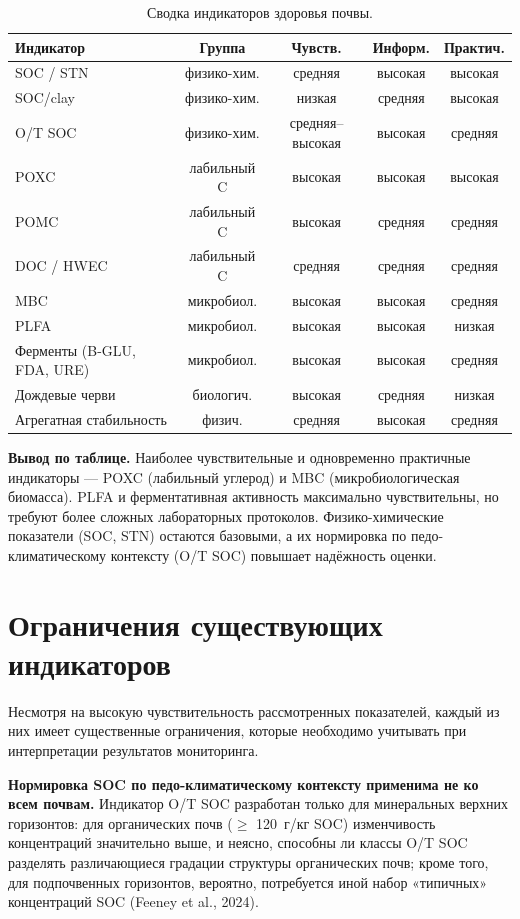 \documentclass[11pt,a4paper]{article}
\begin{document}
\begin{table}[h]
  \centering
  \caption{Сводка индикаторов здоровья почвы.}
  \label{tab:indicators}
  \small
  \begin{tabular}{lcccc}
    \toprule
    Индикатор & Группа & Чувств. & Информ. & Практич. \\
    \midrule
    SOC / STN & физико-хим. & средняя & высокая & высокая \\
    SOC/clay & физико-хим. & низкая & средняя & высокая \\
    O/T SOC & физико-хим. & средняя--высокая & высокая & средняя \\
    POXC & лабильный C & высокая & высокая & высокая \\
    POMC & лабильный C & высокая & средняя & средняя \\
    DOC / HWEC & лабильный C & средняя & средняя & средняя \\
    MBC & микробиол. & высокая & высокая & средняя \\
    PLFA & микробиол. & высокая & высокая & низкая \\
    Ферменты (B-GLU, FDA, URE) & микробиол. & высокая & высокая & средняя \\
    Дождевые черви & биологич. & высокая & средняя & низкая \\
    Агрегатная стабильность & физич. & средняя & высокая & средняя \\
    \bottomrule
  \end{tabular}
\end{table}

\textbf{Вывод по таблице.} Наиболее чувствительные и одновременно практичные
индикаторы --- POXC (лабильный углерод) и MBC (микробиологическая биомасса).
PLFA и ферментативная активность максимально чувствительны, но требуют более
сложных лабораторных протоколов. Физико-химические показатели (SOC, STN)
остаются базовыми, а их нормировка по педо-климатическому контексту (O/T SOC)
повышает надёжность оценки.

\section{Ограничения существующих индикаторов}
\label{sec:limitations}

Несмотря на высокую чувствительность рассмотренных показателей, каждый из
них имеет существенные ограничения, которые необходимо учитывать при
интерпретации результатов мониторинга.

\textbf{Нормировка SOC по педо-климатическому контексту применима не ко всем
почвам.} Индикатор O/T SOC разработан только для минеральных верхних
горизонтов: для органических почв ($\geq$ 120~г/кг SOC) изменчивость
концентраций значительно выше, и неясно, способны ли классы O/T SOC разделять
различающиеся градации структуры органических почв; кроме того, для
подпочвенных горизонтов, вероятно, потребуется иной набор «типичных»
концентраций SOC (Feeney et al., 2024).
\end{document}
